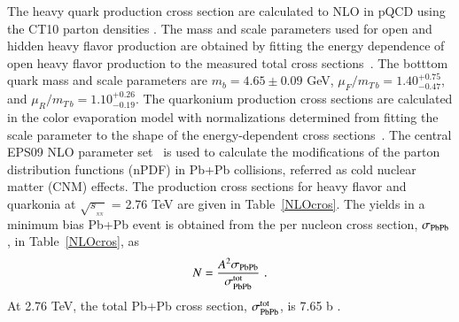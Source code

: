 
The heavy quark production cross section are calculated to NLO in pQCD  
using the CT10 parton densities \cite{Lai:2010vv}. The mass and scale parameters used 
for open and hidden heavy flavor production are obtained by fitting the energy dependence 
of open heavy flavor production to the measured total cross sections~\cite{Nelson:2012bc}.
The botttom quark mass and scale parameters are $m_b = 4.65 \pm 0.09$ GeV,
$\mu_F/m_{T\, b} = 1.40^{+0.75}_{-0.47}$, and $\mu_R/m_{T\, b} = 1.10^{+0.26}_{-0.19}$.
The quarkonium production cross sections are calculated in the color evaporation model with
normalizations determined from fitting the scale parameter to the shape of the energy-dependent
cross sections~\cite{Nelson:2012bc}.
The central EPS09 NLO parameter set~\cite{Eskola:2009uj} is used to 
calculate the modifications of the parton distribution functions (nPDF) in 
Pb+Pb collisions, referred as cold nuclear matter (CNM) effects.
The production cross sections for heavy flavor and quarkonia at $\sqrt{s_{_{_{NN}}}}$ = 2.76 
TeV \cite{Kumar:2012qx} are given in Table~\ref{NLOcros}.  The yields in a minimum bias 
Pb+Pb event is obtained from the per nucleon cross
section, $\sigma_{\rm PbPb}$, in Table~\ref{NLOcros}, as
\begin{eqnarray}
N = {A^2 \sigma_{\rm PbPb} \over  
\sigma_{\rm PbPb}^{\rm tot}} \, \, .
\end{eqnarray}
 At 2.76 TeV, the total Pb+Pb cross section, $\sigma_{\rm PbPb}^{\rm tot}$, 
is 7.65 b \cite{Chatrchyan:2011sx}.


